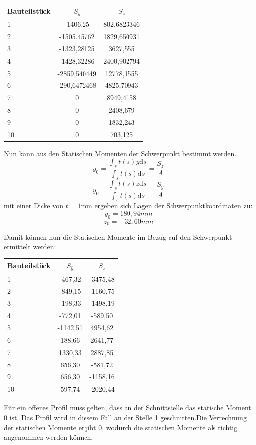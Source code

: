 \begin{center}
\begin{tabular}[h]{l|c|c}
Bauteilstück&$S_{y}$&$S_{z}$\\
\hline
1& -1406,25&802,6823346\\
2&-1505,45762&1829,650931\\
3&-1323,28125&3627,555\\
4&-1428,32286&2400,902794\\
5&-2859,540449&12778,1555\\
6&-290,6472468&4825,70943\\
7&0&8949,4158\\
8&0&2408,679\\
9&0&1832,243\\
10&0&703,125\\
\end{tabular}

\end{center}
Nun kann aus den Statischen Momenten der Schwerpunkt bestimmt werden.
$$y_{0}=\frac{\int_{s}{}t(s)y\mathrm{d}s}{\int_{s}{}t(s)\mathrm{d}s}=\frac{S_{z}}{A}$$
$$y_{0}=\frac{\int_{s}{}t(s)z\mathrm{d}s}{\int_{s}{}t(s)\mathrm{d}s}=\frac{S_{y}}{A}$$
mit einer Dicke von $t=1\mathrm{mm}$ ergeben sich Lagen der Schwerpunktkoordinaten zu:
$$y_{0}=180,94mm$$
$$z_{0}=-32,60mm$$

Damit können nun die Statischen Momente im Bezug auf den Schwerpunkt ermittelt werden:
\begin{center}
\begin{tabular}[h]{l|c|c}
Bauteilstück&$S_{\bar{y}}$&$S_{\bar{z}}$\\
\hline
1&-467,32&-3475,48\\
2&-849,15&-1160,75\\
3&-198,33&-1498,19\\
4&-772,01&-589,50\\
5&-1142,51&4954,62\\
6&188,66&2641,77\\
7&1330,33&2887,85\\
8&656,30&-581,72\\
9&656,30&-1158,16\\
10&597,74&-2020,44\\
\end{tabular}
\end{center}
Für ein offenes Profil muss gelten, dass an der Schnittstelle das statische Moment 0 ist. Das Profil wird in diesem Fall an der Stelle 1 geschnitten.Die Verrechnung der statischen Momente ergibt 0, wodurch die statischen Momente als richtig angenommen werden können.


